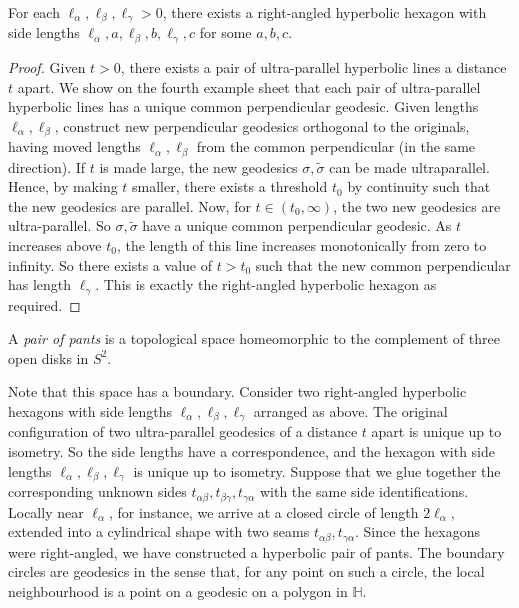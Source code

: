 \begin{lemma}
	For each \( \ell_\alpha, \ell_\beta, \ell_\gamma > 0 \), there exists a right-angled hyperbolic hexagon with side lengths \( \ell_\alpha, a, \ell_\beta, b, \ell_\gamma, c \) for some \( a,b,c \).
\end{lemma}
\begin{proof}
	Given \( t > 0 \), there exists a pair of ultra-parallel hyperbolic lines a distance \( t \) apart.
	We show on the fourth example sheet that each pair of ultra-parallel hyperbolic lines has a unique common perpendicular geodesic.
	Given lengths \( \ell_\alpha, \ell_\beta \), construct new perpendicular geodesics orthogonal to the originals, having moved lengths \( \ell_\alpha, \ell_\beta \) from the common perpendicular (in the same direction).
	If \( t \) is made large, the new geodesics \( \sigma, \widetilde \sigma \) can be made ultraparallel.
	Hence, by making \( t \) smaller, there exists a threshold \( t_0 \) by continuity such that the new geodesics are parallel.
	Now, for \( t \in (t_0,\infty) \), the two new geodesics are ultra-parallel.
	So \( \sigma, \widetilde \sigma \) have a unique common perpendicular geodesic.
	As \( t \) increases above \( t_0 \), the length of this line increases monotonically from zero to infinity.
	So there exists a value of \( t > t_0 \) such that the new common perpendicular has length \( \ell_\gamma \).
	\makeatikzfig
	This is exactly the right-angled hyperbolic hexagon as required.
\end{proof}
\begin{definition}
	A \textit{pair of pants} is a topological space homeomorphic to the complement of three open disks in \( S^2 \).
\end{definition}
Note that this space has a boundary.
Consider two right-angled hyperbolic hexagons with side lengths \( \ell_\alpha, \ell_\beta, \ell_\gamma \) arranged as above.
The original configuration of two ultra-parallel geodesics of a distance \( t \) apart is unique up to isometry.
So the side lengths have a correspondence, and the hexagon with side lengths \( \ell_\alpha, \ell_\beta, \ell_\gamma \) is unique up to isometry.
Suppose that we glue together the corresponding unknown sides \( t_{\alpha\beta}, t_{\beta\gamma}, t_{\gamma\alpha} \) with the same side identifications.
Locally near \( \ell_\alpha \), for instance, we arrive at a closed circle of length \( 2\ell_\alpha \), extended into a cylindrical shape with two seams \( t_{\alpha\beta}, t_{\gamma\alpha} \).
Since the hexagons were right-angled, we have constructed a hyperbolic pair of pants.
The boundary circles are geodesics in the sense that, for any point on such a circle, the local neighbourhood is a point on a geodesic on a polygon in \( \mathbb H \).

